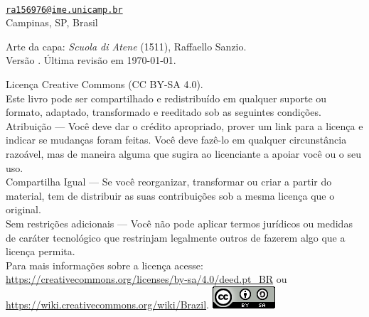\thispagestyle{empty}

\noindent
\autor \\
\href{mailto:ra156976@ime.unicamp.br}{\texttt{ra156976@ime.unicamp.br}}\\
Campinas, SP, Brasil

\vfill

\noindent Arte da capa: \textit{Scuola di Atene} (1511), Raffaello Sanzio.
\vspace*{0.5cm}\\
Versão \versao. Última revisão em \today.
\vspace*{0.5cm}\\
\begin{small}
\noindent
\ccLogo{} Licença Creative Commons (CC BY-SA 4.0).\\
Este livro pode ser compartilhado e redistribuído em qualquer suporte ou formato, adaptado, transformado e reeditado sob as seguintes condições.\\
Atribuição --- Você deve dar o crédito apropriado, prover um link para a licença e indicar se mudanças foram feitas. Você deve fazê-lo em qualquer circunstância razoável, mas de maneira alguma que sugira ao licenciante a apoiar você ou o seu uso.\\
Compartilha Igual --- Se você reorganizar, transformar ou criar a partir do material, tem de distribuir as suas contribuições sob a mesma licença que o original.\\
Sem restrições adicionais --- Você não pode aplicar termos jurídicos ou medidas de caráter tecnológico que restrinjam legalmente outros de fazerem algo que a licença permita.\\
Para mais informações sobre a licença acesse:\\
\url{https://creativecommons.org/licenses/by-sa/4.0/deed.pt_BR} ou\\
\url{https://wiki.creativecommons.org/wiki/Brazil}. \hfill
\includegraphics[height=\baselineskip]{./imagens/licensa.png}
\end{small}
